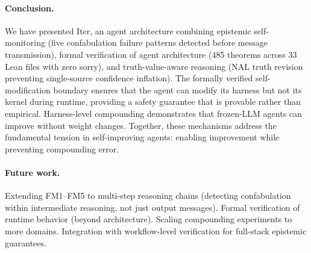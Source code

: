 \documentclass{article}
\begin{document}
\paragraph{Conclusion.} We have presented Iter, an agent architecture combining epistemic self-monitoring (five confabulation failure patterns detected before message transmission), formal verification of agent architecture (485 theorems across 33 Lean files with zero sorry), and truth-value-aware reasoning (NAL truth revision preventing single-source confidence inflation). The formally verified self-modification boundary ensures that the agent can modify its harness but not its kernel during runtime, providing a safety guarantee that is provable rather than empirical. Harness-level compounding demonstrates that frozen-LLM agents can improve without weight changes. Together, these mechanisms address the fundamental tension in self-improving agents: enabling improvement while preventing compounding error.

\paragraph{Future work.} Extending FM1--FM5 to multi-step reasoning chains (detecting confabulation within intermediate reasoning, not just output messages). Formal verification of runtime behavior (beyond architecture). Scaling compounding experiments to more domains. Integration with workflow-level verification \citep{lean4agent} for full-stack epistemic guarantees.



\end{document}
